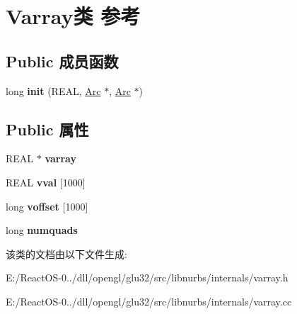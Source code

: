 \hypertarget{class_varray}{}\section{Varray类 参考}
\label{class_varray}
\subsection*{Public 成员函数}
\begin{DoxyCompactItemize}
\item 
\mbox{\label{class_varray_aa831ee26d134dea855e06a74581a4a23}} 
long {\bfseries init} (R\+E\+AL, \hyperlink{class_arc}{Arc} $\ast$, \hyperlink{class_arc}{Arc} $\ast$)
\end{DoxyCompactItemize}
\subsection*{Public 属性}
\begin{DoxyCompactItemize}
\item 
\mbox{\label{class_varray_a7f7e5204fdddc1b2fa1ef13fd0b8474e}} 
R\+E\+AL $\ast$ {\bfseries varray}
\item 
\mbox{\label{class_varray_aed8543347883cfbd37b7e30571ebdc49}} 
R\+E\+AL {\bfseries vval} \mbox{[}1000\mbox{]}
\item 
\mbox{\label{class_varray_aecf8f6c328db77347e4db28173f4c845}} 
long {\bfseries voffset} \mbox{[}1000\mbox{]}
\item 
\mbox{\label{class_varray_a07d8a644457a527052cf6c179e09d547}} 
long {\bfseries numquads}
\end{DoxyCompactItemize}


该类的文档由以下文件生成\+:\begin{DoxyCompactItemize}
\item 
E\+:/\+React\+O\+S-\/0../dll/opengl/glu32/src/libnurbs/internals/varray.\+h\item 
E\+:/\+React\+O\+S-\/0../dll/opengl/glu32/src/libnurbs/internals/varray.\+cc\end{DoxyCompactItemize}

